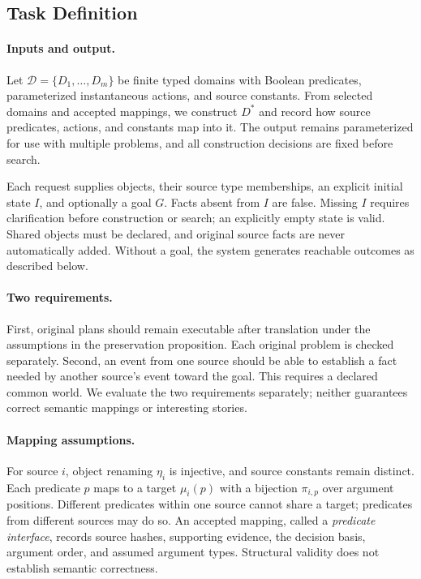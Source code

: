 \documentclass[letterpaper]{article}
\begin{document}
\subsection{Task Definition}
\paragraph{Inputs and output.}
Let $\mathcal D=\{D_1,\ldots,D_m\}$ be finite typed domains with Boolean predicates, parameterized instantaneous actions, and source constants. From selected domains and accepted mappings, we construct $D^*$ and record how source predicates, actions, and constants map into it. The output remains parameterized for use with multiple problems, and all construction decisions are fixed before search.

Each request supplies objects, their source type memberships, an explicit initial state $I$, and optionally a goal $G$. Facts absent from $I$ are false. Missing $I$ requires clarification before construction or search; an explicitly empty state is valid. Shared objects must be declared, and original source facts are never automatically added. Without a goal, the system generates reachable outcomes as described below.

\paragraph{Two requirements.}
First, original plans should remain executable after translation under the assumptions in the preservation proposition. Each original problem is checked separately. Second, an event from one source should be able to establish a fact needed by another source's event toward the goal. This requires a declared common world. We evaluate the two requirements separately; neither guarantees correct semantic mappings or interesting stories.

\paragraph{Mapping assumptions.}
For source $i$, object renaming $\eta_i$ is injective, and source constants remain distinct. Each predicate $p$ maps to a target $\mu_i(p)$ with a bijection $\pi_{i,p}$ over argument positions. Different predicates within one source cannot share a target; predicates from different sources may do so. An accepted mapping, called a \emph{predicate interface}, records source hashes, supporting evidence, the decision basis, argument order, and assumed argument types. Structural validity does not establish semantic correctness.
\end{document}
